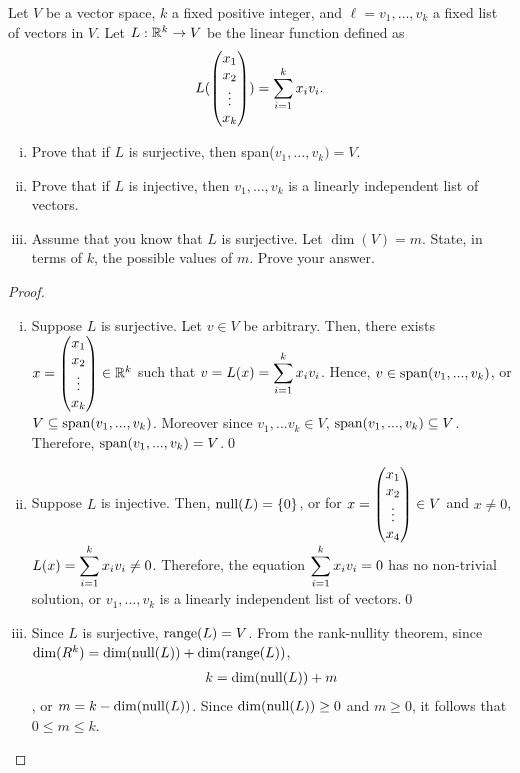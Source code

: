 \begin{question}\label{que:CoordinateFunction}
	\normalfont
	
		
	Let $V$ be a vector space, $k$ a fixed positive integer, and $\ell = v_1,\dots, v_k$ a fixed list of vectors in $V$. Let $L:{\mathbb R}^k\to V$ be the linear function defined as
	\begin{align}\label{eq:LCoordinateMap}
		L(\begin{pmatrix} x_1\\ x_2\\\vdots \\ x_k\end{pmatrix}) = \sum_{i=1}^k x_iv_i.
	\end{align}
	
	\begin{enumerate}[(i)]
		\item Prove that if $L$ is surjective, then span($v_1,\dots, v_k) = V$.
		
		\item Prove that if $L$ is injective, then $v_1,\dots, v_k$ is a linearly independent list of vectors.
		
		\item Assume that you know that $L$ is surjective.  Let $\dim(V)=m$. State, in terms of $k$, the possible values of $m$.  Prove your answer.
		
		
	\end{enumerate}
\end{question}

\begin{proof}
    \renewcommand{\qedsymbol}{$\blacksquare$}
    \begin{enumerate}[(i)]
        \item Suppose $L$ is surjective. Let $v\in V$ be arbitrary.
        Then, there exists $x=\begin{pmatrix} x_1\\ x_2\\\vdots \\ x_k\end{pmatrix}\in\mathbb R^k$ such that $v=L(x)=\mathlarger{\sum_{i=1}^{k}x_iv_i}$. Hence, $v\in\textnormal{span}(v_1,...,v_k)$, or $V\subseteq\textnormal{span}(v_1,...,v_k)$.
        Moreover since $v_1,...v_k\in V$, $\textnormal{span}(v_1,...,v_k)\subseteq V$.
        Therefore, $\textnormal{span}(v_1,...,v_k)=V$.\qed

        \item Suppose $L$ is injective.
        Then, $\textnormal{null}(L)=\{0\}$, or for $x=\begin{pmatrix} x_1\\ x_2\\\vdots \\ x_4\end{pmatrix}\in V$ and $x\not=0$, $L(x)=\mathlarger{\sum_{i=1}^{k}x_iv_i}\not= 0$. 
        Therefore, the equation $\mathlarger{\sum_{i=1}^{k}x_iv_i}=0$ has no non-trivial solution, or $v_1,...,v_k$ is a linearly independent list of vectors.\qed

        \item Since $L$ is surjective, $\textnormal{range}(L)=V$. From the rank-nullity theorem, since $\textnormal{dim}(R^k)=\textnormal{dim}(\textnormal{null}(L))+\textnormal{dim}(\textnormal{range}(L))$, 
        \[
            \begin{aligned}
                k=\textnormal{dim}(\textnormal{null}(L))+m
            \end{aligned}
        \]
        , or $m=k-\textnormal{dim}(\textnormal{null}(L))$.
        Since $\textnormal{dim}(\textnormal{null}(L))\geq 0$ and $m\geq 0$, it follows that $0\leq m\leq k$.
    \end{enumerate}
    \renewcommand{\qedsymbol}{}
\end{proof}